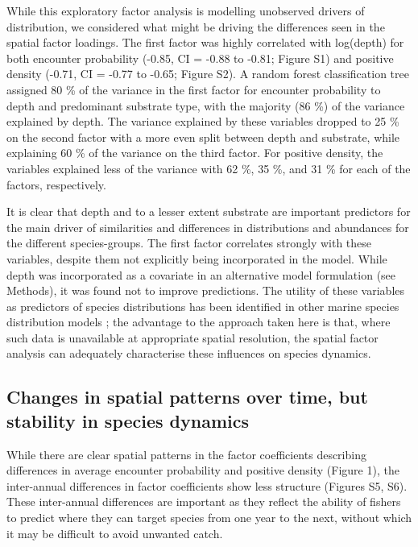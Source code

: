 \documentclass{nature}
\begin{document}
\begin{linenumbers}
While this exploratory factor analysis is modelling unobserved drivers of
distribution, we considered what might be driving the differences seen in the
spatial factor loadings. The first factor was highly correlated with log(depth)
for both encounter probability (-0.85, CI = -0.88 to -0.81; Figure S1) and
positive density (-0.71, CI = -0.77 to -0.65; Figure S2). A random forest
classification tree assigned 80 \% of the variance in the first factor for
encounter probability to depth and predominant substrate type, with the
majority (86 \%) of the variance explained by depth. The variance explained by
these variables dropped to 25 \% on the second factor with a more even split
between depth and substrate, while explaining 60 \% of the variance on the
third factor.  For positive density, the variables explained less of the
variance with 62 \%, 35 \%, and 31 \% for each of the factors, respectively.

It is clear that depth and to a lesser extent substrate are important
predictors for the main driver of similarities and differences in distributions
and abundances for the different species-groups. The first factor correlates
strongly with these variables, despite them not explicitly being incorporated
in the model. While depth was incorporated as a covariate in an alternative
model formulation (see Methods), it was found not to improve predictions. The
utility of these variables as predictors of species distributions has been
identified in other marine species distribution models \cite{Robinson2011}; the
advantage to the approach taken here is that, where such data is unavailable at
appropriate spatial resolution, the spatial factor analysis can adequately
characterise these influences on species dynamics.

\subsection{Changes in spatial patterns over time, but stability in species
	dynamics} While there are clear spatial patterns in the factor
coefficients describing differences in average encounter probability and
positive density (Figure 1), the inter-annual differences in factor
coefficients show less structure (Figures S5, S6). These inter-annual
differences are important as they reflect the ability of fishers to predict
where they can target species from one year to the next, without which it may
be difficult to avoid unwanted catch.


\end{linenumbers}
\end{document}
